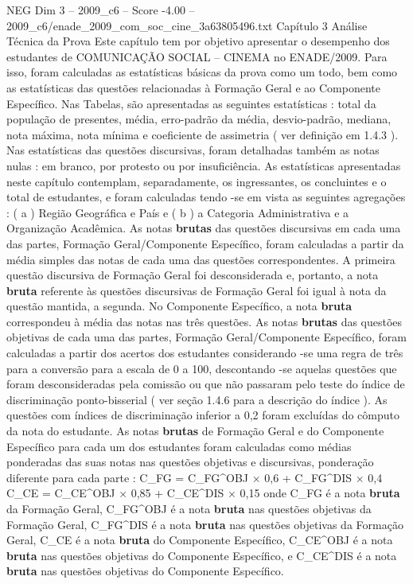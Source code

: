 \begin{textsample}{NEG Dim 3 – 2009\_c6 – Score -4.00 – 2009\_c6/enade\_2009\_com\_soc\_cine\_3a63805496.txt}  \label{ex:f3_neg_040}
Capítulo 3 Análise Técnica da Prova Este capítulo tem por objetivo apresentar o desempenho dos estudantes de COMUNICAÇÃO SOCIAL – CINEMA no ENADE/2009.
Para isso, foram calculadas as estatísticas básicas da prova como um todo, bem como as estatísticas das questões relacionadas à Formação Geral e ao Componente Específico.
Nas Tabelas, são apresentadas as seguintes estatísticas : total da população de presentes, média, erro-padrão da média, desvio-padrão, mediana, nota máxima, nota mínima e coeficiente de assimetria ( ver definição em 1.4.3 ).
Nas estatísticas das questões discursivas, foram detalhadas também as notas nulas : em branco, por protesto ou por insuficiência.
As estatísticas apresentadas neste capítulo contemplam, separadamente, os ingressantes, os concluintes e o total de estudantes, e foram calculadas tendo -se em vista as seguintes agregações : ( a ) Região Geográfica e País e ( b ) a Categoria Administrativa e a Organização Acadêmica.
As notas \textbf{brutas} das questões discursivas em cada uma das partes, Formação Geral/Componente Específico, foram calculadas a partir da média simples das notas de cada uma das questões correspondentes.
A primeira questão discursiva de Formação Geral foi desconsiderada e, portanto, a nota \textbf{bruta} referente às questões discursivas de Formação Geral foi igual à nota da questão mantida, a segunda.
No Componente Específico, a nota \textbf{bruta} correspondeu à média das notas nas três questões.
As notas \textbf{brutas} das questões objetivas de cada uma das partes, Formação Geral/Componente Específico, foram calculadas a partir dos acertos dos estudantes considerando -se uma regra de três para a conversão para a escala de 0 a 100, descontando -se aquelas questões que foram desconsideradas pela comissão ou que não passaram pelo teste do índice de discriminação ponto-bisserial ( ver seção 1.4.6 para a descrição do índice ).
As questões com índices de discriminação inferior a 0,2 foram excluídas do cômputo da nota do estudante.
As notas \textbf{brutas} de Formação Geral e do Componente Específico para cada um dos estudantes foram calculadas como médias ponderadas das suas notas nas questões objetivas e discursivas, ponderação diferente para cada parte : C\_FG = C\_FG\textasciicircum{}OBJ × 0,6 + C\_FG\textasciicircum{}DIS × 0,4 C\_CE = C\_CE\textasciicircum{}OBJ × 0,85 + C\_CE\textasciicircum{}DIS × 0,15 onde C\_FG é a nota \textbf{bruta} da Formação Geral, C\_FG\textasciicircum{}OBJ é a nota \textbf{bruta} nas questões objetivas da Formação Geral, C\_FG\textasciicircum{}DIS é a nota \textbf{bruta} nas questões objetivas da Formação Geral, C\_CE é a nota \textbf{bruta} do Componente Específico, C\_CE\textasciicircum{}OBJ é a nota \textbf{bruta} nas questões objetivas do Componente Específico, e C\_CE\textasciicircum{}DIS é a nota \textbf{bruta} nas questões objetivas do Componente Específico.

\end{textsample}
